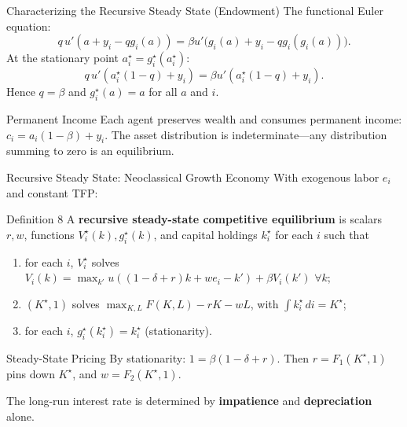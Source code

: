 \documentclass[aspectratio=169,10pt]{beamer}
\begin{document}
\begin{frame}{Characterizing the Recursive Steady State (Endowment)}
The functional Euler equation:
\[
q\,u'(a+y_i-qg_i(a))
=
\beta u'\big(g_i(a)+y_i-qg_i(g_i(a))\big).
\]
At the stationary point $a_i^\star=g_i^\star(a_i^\star)$:
\[
q\,u'(a_i^\star(1-q)+y_i)
=
\beta u'(a_i^\star(1-q)+y_i).
\]
Hence $q=\beta$ and $g_i^\star(a)=a$ for all $a$ and $i$.

\begin{block}{Permanent Income}
Each agent preserves wealth and consumes permanent income: $c_i = a_i(1-\beta)+y_i$. The asset distribution is indeterminate---any distribution summing to zero is an equilibrium.
\end{block}
\end{frame}

\begin{frame}{Recursive Steady State: Neoclassical Growth Economy}
\hypertarget{m-ss-growth}{}
With exogenous labor $e_i$ and constant TFP:

\begin{block}{Definition 8}
A \textbf{recursive steady-state competitive equilibrium} is scalars $r,w$, functions $V_i^\star(k), g_i^\star(k)$, and capital holdings $k_i^\star$ for each $i$ such that
\begin{enumerate}
  \item for each $i$, $V_i^\star$ solves $V_i(k)=\max_{k'} u((1-\delta+r)k+we_i-k')+\beta V_i(k')$ $\forall k$;
  \item $(K^\star,1)$ solves $\max_{K,L} F(K,L)-rK-wL$, with $\int k_i^\star\,di=K^\star$;
  \item for each $i$, $g_i^\star(k_i^\star)=k_i^\star$ (stationarity).
\end{enumerate}
\end{block}

\begin{block}{Steady-State Pricing}
By stationarity: $1=\beta(1-\delta+r)$. Then $r=F_1(K^\star,1)$ pins down $K^\star$, and $w=F_2(K^\star,1)$.

The long-run interest rate is determined by \textbf{impatience} and \textbf{depreciation} alone.
\end{block}
\end{frame}
\end{document}
